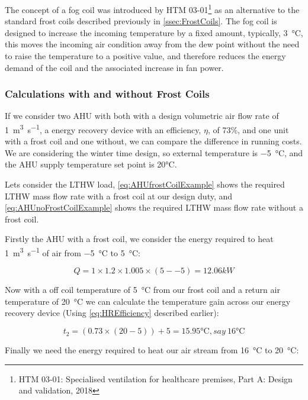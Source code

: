 The concept of a fog coil was introduced by \gls{HTM} 03-01\footnote{HTM 03-01: Specialised ventilation for healthcare premises, Part A: Design and validation, 2018} as an alternative to the standard frost coils described previously in \autoref{ssec:FrostCoils}.  The fog coil is designed to increase the incoming temperature by a fixed amount, typically, \SI{3}{\celsius}, this moves the incoming air condition away from the dew point without the need to raise the temperature to a positive value, and therefore reduces the energy demand of the coil and the associated increase in fan power.

\subsubsection{Calculations with and without Frost Coils}

If we consider two AHU with both with a design volumetric air flow rate of \SI{1}{\cubic\metre\per\second}, a energy recovery device with an efficiency, $\eta$, of 73\%, and one unit with a frost coil and one without, we can compare the difference in running costs.  We are considering the winter time design, so external temperature is \SI{-5}{\celsius}, and the AHU supply temperature set point is 20\si{\celsius}.

Lets consider the LTHW load, \autoref{eq:AHUfrostCoilExample} shows the required LTHW mass flow rate with a frost coil at our design duty, and \autoref{eq:AHUnoFrostCoilExample} shows the required LTHW mass flow rate without a frost coil.

Firstly the AHU with a frost coil, we consider the energy required to heat \SI{1}{\cubic\metre\per\second} of air from \SI{-5}{\celsius} to \SI{5}{\celsius}:

\begin{equation}
Q = 1 \times 1.2 \times 1.005 \times (5--5) = 12.06 kW
\end{equation}

Now with a off coil temperature of \SI{5}{\celsius} from our frost coil and a return air temperature of \SI{20}{\celsius} we can calculate the temperature gain across our energy recovery device (Using \autoref{eq:HREfficiency} described earlier):

\begin{equation}
t_2 = (0.73 \times (20 - 5)) + 5 = 15.95\si{\celsius}, say~16\si{\celsius}
\end{equation}

Finally we need the energy required to heat our air stream from \SI{16}{\celsius} to \SI{20}{\celsius}:

